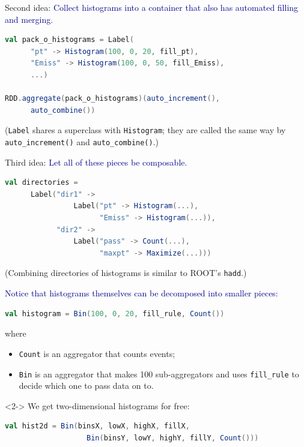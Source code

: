 \documentclass{beamer}
\begin{document}
\begin{frame}[fragile]{Second idea:}
\textcolor{darkblue}{\large Collect histograms into a container that also has automated filling and merging.}

\begin{lstlisting}[language=scala]
val pack_o_histograms = Label(
      "pt" -> Histogram(100, 0, 20, fill_pt),
      "Emiss" -> Histogram(100, 0, 50, fill_Emiss),
      ...)

RDD.aggregate(pack_o_histograms)(auto_increment(),
      auto_combine())
\end{lstlisting}

\vfill
({\tt \small Label} shares a superclass with {\tt \small Histogram}; they are called the same way by {\tt \small auto\_increment()} and {\tt \small auto\_combine()}.)
\end{frame}

\begin{frame}[fragile]{Third idea:}
\textcolor{darkblue}{\large Let all of these pieces be composable.}

\begin{lstlisting}[language=scala]
val directories =
      Label("dir1" ->
                Label("pt" -> Histogram(...),
                      "Emiss" -> Histogram(...)),
            "dir2" ->
                Label("pass" -> Count(...),
                      "maxpt" -> Maximize(...)))
\end{lstlisting}

\vspace{0.5 cm}
(Combining directories of histograms is similar to ROOT's {\tt \small hadd}.)
\end{frame}

\begin{frame}[fragile]{}
\textcolor{darkblue}{\large Notice that histograms themselves can be decomposed into smaller pieces:}

\begin{lstlisting}[language=scala]
val histogram = Bin(100, 0, 20, fill_rule, Count())
\end{lstlisting}

where
\begin{itemize}
\item {\tt \small Count} is an aggregator that counts events;
\item {\tt \small Bin} is an aggregator that makes 100 sub-aggregators and uses {\tt \small fill\_rule} to decide which one to pass data on to.
\end{itemize}

\vfill
\begin{uncoverenv}<2->
We get two-dimensional histograms for free:
\begin{lstlisting}[language=scala]
val hist2d = Bin(binsX, lowX, highX, fillX,
                   Bin(binsY, lowY, highY, fillY, Count()))
\end{lstlisting}
\end{uncoverenv}
\vspace{-2 cm}
\end{frame}
\end{document}
